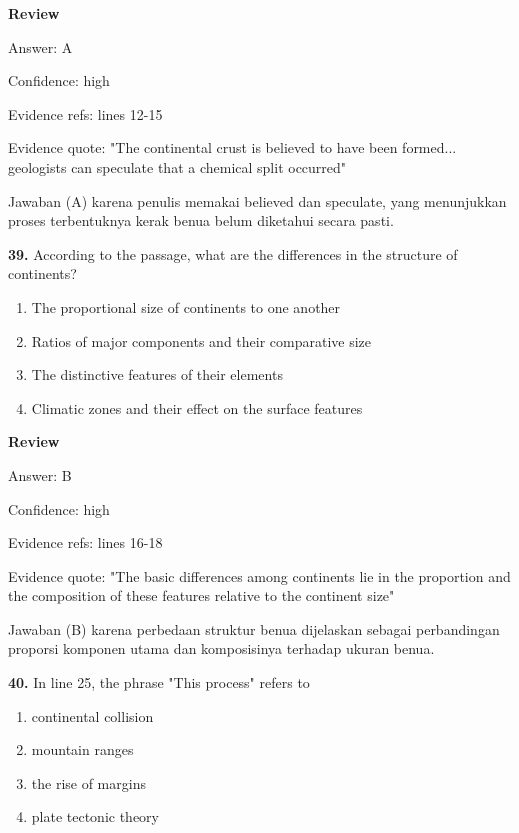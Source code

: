 \documentclass[12pt]{article}
\begin{document}
\par
\begingroup
\setlength{\parskip}{0pt}
\setlength{\parindent}{0pt}
\textbf{Review}\par
Answer: A\par
Confidence: high\par
Evidence refs: lines 12-15\par
Evidence quote: "The continental crust is believed to have been formed... geologists can speculate that a chemical split occurred"\par
Jawaban (A) karena penulis memakai believed dan speculate, yang menunjukkan proses terbentuknya kerak benua belum diketahui secara pasti.\par
\endgroup
\par
\vspace{0.25\baselineskip}
\noindent\textbf{39.} According to the passage, what are the differences in the structure of continents?
\begin{enumerate}[label=(\Alph*),leftmargin=*,itemsep=0.2em]
\item The proportional size of continents to one another
\item Ratios of major components and their comparative size
\item The distinctive features of their elements
\item Climatic zones and their effect on the surface features
\end{enumerate}
\par
\begingroup
\setlength{\parskip}{0pt}
\setlength{\parindent}{0pt}
\textbf{Review}\par
Answer: B\par
Confidence: high\par
Evidence refs: lines 16-18\par
Evidence quote: "The basic differences among continents lie in the proportion and the composition of these features relative to the continent size"\par
Jawaban (B) karena perbedaan struktur benua dijelaskan sebagai perbandingan proporsi komponen utama dan komposisinya terhadap ukuran benua.\par
\endgroup
\par
\vspace{0.25\baselineskip}
\noindent\textbf{40.} In line 25, the phrase "This process" refers to
\begin{enumerate}[label=(\Alph*),leftmargin=*,itemsep=0.2em]
\item continental collision
\item mountain ranges
\item the rise of margins
\item plate tectonic theory
\end{enumerate}
\end{document}
